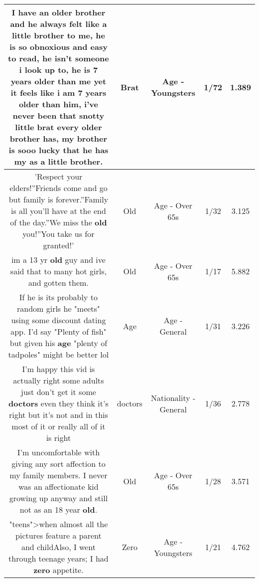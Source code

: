 \documentclass[11pt]{article}
\newlength\mylength
\begin{document}
\begin{center}
\begin{longtable}{|C{.65\mylength}|C{.30\mylength}|C{.12\mylength}|C{.12\mylength}|C{.12\mylength}|}
  \small I have an older brother and he always felt like a little brother to me, he is so obnoxious and easy to read, he isn't someone i look up to, he is 7 years older than me yet it feels like i am 7 years older than him, i've never been that snotty little \textbf{brat} every older brother has, my brother is sooo lucky that he has my as a little brother.\normalsize   & Brat & Age - Youngsters & 1/72 & 1.389 \\  \hline
  \small 'Respect your elders!''Friends come and go but family is forever.''Family is all you'll have at the end of the day.''We miss the \textbf{old} you!''You take us for granted!'\normalsize   & Old & Age - Over 65s & 1/32 & 3.125 \\  \hline
  \small im a 13 yr \textbf{old} guy and ive said that to many hot girls, and gotten them.\normalsize   & Old & Age - Over 65s & 1/17 & 5.882 \\  \hline
  \small If he is its probably to random girls he "meets" using some discount dating app. I'd say "Plenty of fish"  but given his \textbf{age} "plenty of tadpoles" might be better lol\normalsize   & Age & Age - General & 1/31 & 3.226 \\  \hline
  \small I'm happy this vid is actually right some adults just don't get it some \textbf{doctors} even they think it's right but it's not and in this most of it or really all of it is right\normalsize   & doctors & Nationality - General & 1/36 & 2.778 \\  \hline
  \small I'm uncomfortable with giving any sort affection to my family members. I never was an affectionate kid growing up anyway and still not as an 18 year \textbf{old}.\normalsize   & Old & Age - Over 65s & 1/28 & 3.571 \\  \hline
  \small "teens">when almost all the pictures feature a parent and childAlso, I went through teenage years; I had \textbf{zero} appetite.\normalsize   & Zero & Age - Youngsters & 1/21 & 4.762 \\  \hline

\end{longtable}
\end{center}
\end{document}
